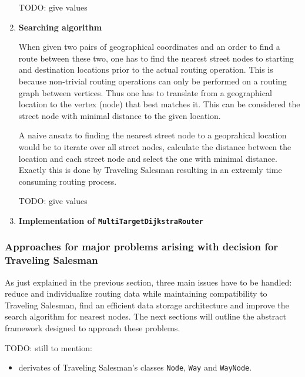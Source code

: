 \begin{enumerate}
		TODO: give values
											
	\item \textbf{Searching algorithm}
	
		When given two pairs of geographical coordinates and an order to find a route between these two, one has to find the nearest street nodes to starting and destination locations prior to the actual routing operation. This is because non-trivial routing operations can only be performed on a routing graph between vertices. Thus one has to translate from a geographical location to the vertex (node) that best matches it. This can be considered the street node with minimal distance to the given location.\newline
				
		A naive ansatz to finding the nearest street node 	to a geoprahical location would be to iterate over all street nodes, calculate the distance between the location and each street node and select the one with minimal distance. Exactly this is done by Traveling Salesman resulting in an extremly time consuming routing process.\newline
		
		TODO: give values

	\item \textbf{Implementation of \texttt{MultiTargetDijkstraRouter}}
	
		

\end{enumerate}


\subsubsection{Approaches for major problems arising with decision for Traveling Salesman}
\label{sec:routing_mobiletsm_approaches}

As just explained in the previous section, three main issues have to be handled: reduce and individualize routing data while maintaining compatibility to Traveling Salesman, find an efficient data storage architecture and improve the search algorithm for nearest nodes. The next sections will outline the abstract framework designed to approach these problems.\newline

TODO: still to mention:
\begin{itemize}
	\item derivates of Traveling Salesman's classes \texttt{Node}, \texttt{Way} and \texttt{WayNode}.
\end{itemize}

